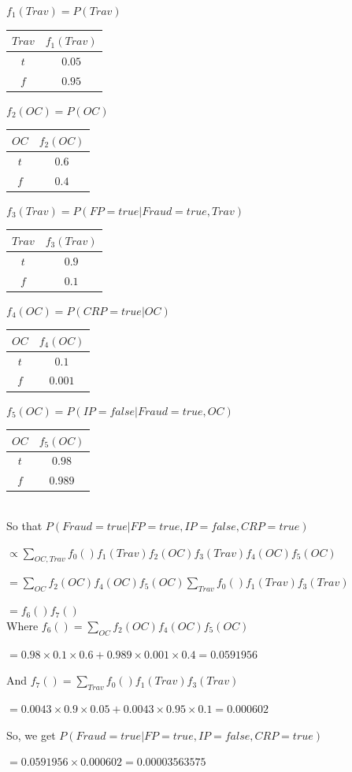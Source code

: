\documentclass[10pt]{article}
\begin{document}
	$f_1(Trav) = P(Trav)$ 
	\begin{tabular}{|c|c|}
	\hline
 	  $Trav$ & $f_1(Trav)$ \\
	\hline
	  $t$ & $ 0.05$  \\
	\hline
	  $f$ & $0.95$ \\
	\hline
	\end{tabular}
	
	$f_2(OC) = P(OC)$
	\begin{tabular}{|c|c|}
	\hline
 	  $OC$ & $f_2(OC)$ \\
	\hline
	  $t$ & $ 0.6$  \\
	\hline
	  $f$ & $0.4$ \\
	\hline
	\end{tabular}
	
	$f_3(Trav) = P(FP = true | Fraud = true, Trav)$
	\begin{tabular}{|c|c|}
	\hline
 	  $Trav$ & $f_3(Trav)$ \\
	\hline
	  $t$ & $ 0.9$  \\
	\hline
	  $f$ & $0.1$ \\
	\hline
	\end{tabular}
	
	
	$f_4(OC) = P(CRP = true | OC)$
	\begin{tabular}{|c|c|}
	\hline
 	  $OC$ & $f_4(OC)$ \\
	\hline
	  $t$ & $ 0.1$  \\
	\hline
	  $f$ & $0.001$ \\
	\hline
	\end{tabular}
	
	$f_5(OC) = P(IP = false | Fraud = true, OC)$
	\begin{tabular}{|c|c|}
	\hline
 	  $OC$ & $f_5(OC)$ \\
	\hline
	  $t$ & $ 0.98$  \\
	\hline
	  $f$ & $0.989$ \\
	\hline
	\end{tabular}\\
	
	
	So that $P(Fraud = true | FP = true, IP = false, CRP = true)$
	
	$\propto \sum_{OC, Trav} f_0() f_1(Trav) f_2(OC) f_3(Trav) f_4(OC) f_5(OC)$
	
	$= \sum_{OC}f_2(OC) f_4(OC) f_5(OC) \sum_{Trav}f_0() f_1(Trav) f_3(Trav)$
	
	$= f_6() f_7()$\\
	
	
	Where $f_6() = \sum_{OC}f_2(OC) f_4(OC) f_5(OC)$
	
	$= 0.98 \times 0.1 \times 0.6 + 0.989 \times 0.001 \times 0.4 = 0.0591956$
	
	
	And $f_7() = \sum_{Trav}f_0() f_1(Trav) f_3(Trav)$
	
	$= 0.0043 \times 0.9 \times 0.05 + 0.0043 \times 0.95 \times 0.1 = 0.000602$
	
	So, we get $P(Fraud = true | FP = true, IP = false, CRP = true)$
	
	$= 0.0591956 \times 0.000602 = 0.00003563575$
	
	\fi
\end{document}

